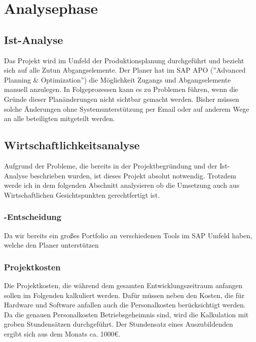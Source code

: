 \section{Analysephase} 
\label{sec:Analysephase}


\subsection{Ist-Analyse} 
\label{sec:IstAnalyse}
Das Projekt wird im Umfeld der Produktionsplanung durchgeführt und bezieht sich auf alle Zutun Abgangselemente. Der Planer hat im SAP APO (”Advanced Planning \& Optimization”) die	Möglichkeit Zugangs und Abgangselemente manuell anzulegen. In Folgeprozessen kann es zu	Problemen führen, wenn die Gründe dieser Planänderungen nicht sichtbar gemacht werden.	Bisher müssen solche Änderungen ohne Systemunterstützung per Email oder auf anderem Wege an alle beteiligten mitgeteilt werden.


\subsection{Wirtschaftlichkeitsanalyse}
\label{sec:Wirtschaftlichkeitsanalyse}
Aufgrund der Probleme, die bereits in der Projektbegründung und der Ist-Analyse beschrieben wurden, ist dieses Projekt absolut notwendig. Trotzdem werde ich in dem folgenden Abschnitt analysieren ob die Umsetzung auch aus Wirtschaftlichen Gesichtspunkten gerechtfertigt ist.


\subsubsection{-Entscheidung}
\label{sec:MakeOrBuyEntscheidung}
Da wir bereits ein großes Portfolio an verschiedenen Tools im SAP Umfeld haben, welche den Planer unterstützen	


\subsubsection{Projektkosten}
\label{sec:Projektkosten}
Die Projektkosten, die während dem gesamten Entwicklungszeitraum anfangen sollen im Folgenden kalkuliert werden. Dafür müssen neben den Kosten, die für Hardware und Software anfallen auch die Personalkosten berücksichtigt werden. Da die genauen Personalkosten Betriebsgeheimnis sind, wird die Kalkulation mit groben Stundensätzen durchgeführt. Der Stundensatz eines Auszubildenden ergibt sich aus dem Monats ca. 1000€.
		
